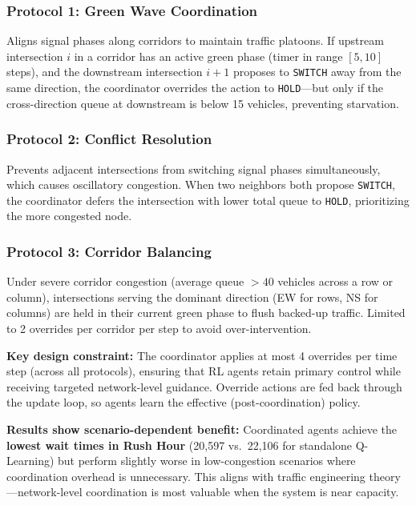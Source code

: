 \documentclass[12pt, a4paper]{article}
\begin{document}
\subsubsection{Protocol 1: Green Wave Coordination}

Aligns signal phases along corridors to maintain traffic platoons. If upstream intersection $i$ in a corridor has an active green phase (timer in range $[5,10]$ steps), and the downstream intersection $i+1$ proposes to \texttt{SWITCH} away from the same direction, the coordinator overrides the action to \texttt{HOLD}---but only if the cross-direction queue at downstream is below 15 vehicles, preventing starvation.

\subsubsection{Protocol 2: Conflict Resolution}

Prevents adjacent intersections from switching signal phases simultaneously, which causes oscillatory congestion. When two neighbors both propose \texttt{SWITCH}, the coordinator defers the intersection with lower total queue to \texttt{HOLD}, prioritizing the more congested node.

\subsubsection{Protocol 3: Corridor Balancing}

Under severe corridor congestion (average queue $> 40$ vehicles across a row or column), intersections serving the dominant direction (EW for rows, NS for columns) are held in their current green phase to flush backed-up traffic. Limited to 2 overrides per corridor per step to avoid over-intervention.

\textbf{Key design constraint:} The coordinator applies at most 4 overrides per time step (across all protocols), ensuring that RL agents retain primary control while receiving targeted network-level guidance. Override actions are fed back through the update loop, so agents learn the effective (post-coordination) policy.

\textbf{Results show scenario-dependent benefit:} Coordinated agents achieve the \textbf{lowest wait times in Rush Hour} (20,597 vs.\ 22,106 for standalone Q-Learning) but perform slightly worse in low-congestion scenarios where coordination overhead is unnecessary. This aligns with traffic engineering theory---network-level coordination is most valuable when the system is near capacity.
\end{document}
